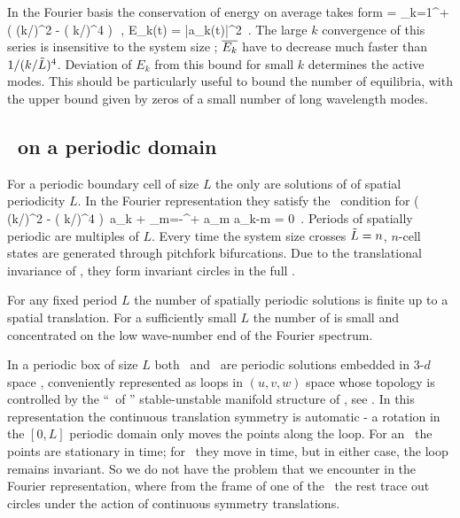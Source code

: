 In the Fourier basis  the conservation of energy on average
takes form
 = \sum_{k=1}^{+\infty} ( (k/\tildeL)^2 - ( k/\tildeL)^4 )\,
\,,\qquad
E_k(t) =  |a_k(t)|^2
\,.
The large $k$ convergence of this series is insensitive to the
system size \tildeL; $\overline{E_k}$ have to decrease much faster than
$1/( k/\tilde{L})^4$.
Deviation of $E_k$ from this bound for small $k$ determines the active modes.
This should be particularly useful to bound the number of equilibria, with
the upper bound given by zeros of a small number
of long wavelength modes.
%

\subsection{\Eqva\ on a periodic domain}

For a periodic boundary cell of size
$L$ the only {\eqva}  are
solutions of  of spatial periodicity $L$.
In the Fourier representation they satisfy
the \eqv\ condition for 
\beq
( (k/\tildeL)^2 - ( k/\tildeL)^4 )\, a_k
    +   \sum_{m=-\infty}^{+\infty} a_m a_{k-m}
  = 0
\,.
\label{eq:stfks}
\eeq
Periods of spatially periodic {\eqva} are multiples of $L$.
Every time the system size crosses  $\tilde{L}=n$,
$n$-cell states
are generated through pitchfork bifurcations.
Due to the translational invariance of {\KSe},
they form invariant circles
in the full \statesp.

For any fixed period $L$ the number
of spatially periodic solutions is finite up to a spatial translation.
For a sufficiently small $L$
the number of {\eqva} is small and
concentrated on the low wave-number end of the Fourier spectrum.

In a periodic box of size $L$
both \eqva\ and \reqva\ are  periodic solutions
embedded in 3-$d$ space ,
conveniently represented as loops in
$(u,v,w)$ space whose topology is controlled by the
``\eqva\ of \eqva'' stable-unstable manifold structure of
, see .
In this representation the continuous translation symmetry
is automatic - a rotation in the $[0,L]$ periodic domain only
moves the points along the loop. For an \eqv\ the points
are stationary in time; for \reqv\ they move in time, but in
either case, the loop remains invariant.
So we do not have the problem that we encounter in the Fourier
representation, where from the frame of one of the \eqva\
the rest trace out circles under the action of continuous symmetry
translations.



